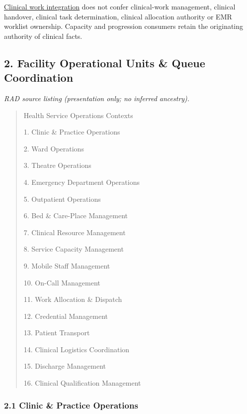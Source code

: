 \hyperref[rad:metamodel:173]{Clinical work integration} does not confer clinical-work management, clinical handover, clinical task determination, clinical allocation authority or EMR worklist ownership. Capacity and progression consumers retain the originating authority of clinical facts.

\label{rad:hso:45}

\par\smallskip
{}\label{rad:hso:47}
\subsection*{2. Facility Operational Units \& Queue Coordination}
\label{rad:hso:49}

\textit{RAD source listing (presentation only; no inferred ancestry).}
\begin{quote}
Health Service Operations Contexts

1. Clinic \& Practice Operations

2. Ward Operations

3. Theatre Operations

4. Emergency Department Operations

5. Outpatient Operations

6. Bed \& Care-Place Management

7. Clinical Resource Management

8. Service Capacity Management

9. Mobile Staff Management

10. On-Call Management

11. Work Allocation \& Dispatch

12. Credential Management

13. Patient Transport

14. Clinical Logistics Coordination

15. Discharge Management

16. Clinical Qualification Management
\end{quote}
\label{rad:hso:69}

\par\smallskip
{}\label{rad:hso:71}
\subsubsection*{2.1 Clinic \& Practice Operations}
\label{rad:hso:72}

